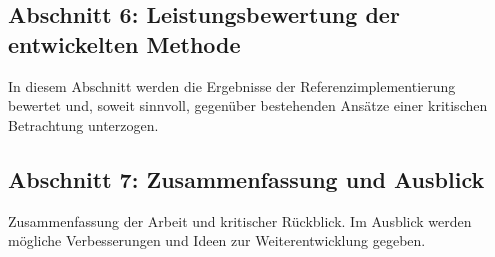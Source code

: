 		\subsection*{Abschnitt 6: Leistungsbewertung der entwickelten Methode}
			In diesem Abschnitt werden die Ergebnisse der Referenzimplementierung bewertet und, soweit sinnvoll, gegenüber bestehenden Ansätze einer kritischen Betrachtung unterzogen. 

		\subsection*{Abschnitt 7: Zusammenfassung und Ausblick}
			Zusammenfassung der Arbeit und kritischer Rückblick. Im Ausblick werden mögliche Verbesserungen und Ideen zur Weiterentwicklung gegeben.  